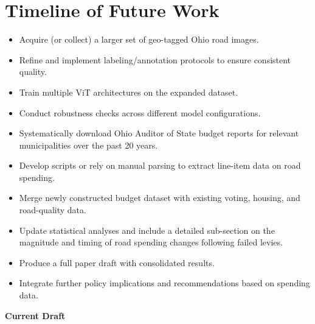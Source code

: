 \newpage

\section*{Timeline of Future Work}

\begin{itemize}
    \item Acquire (or collect) a larger set of geo-tagged Ohio road images.
    \item Refine and implement labeling/annotation protocols to ensure consistent quality.
\end{itemize}

\begin{itemize}
    \item Train multiple ViT architectures on the expanded dataset.
    \item Conduct robustness checks across different model configurations.
\end{itemize}

\begin{itemize}
    \item Systematically download Ohio Auditor of State budget reports for relevant municipalities over the past 20 years.
    \item Develop scripts or rely on manual parsing to extract line-item data on road spending.
\end{itemize}

\begin{itemize}
    \item Merge newly constructed budget dataset with existing voting, housing, and road-quality data.
    \item Update statistical analyses and include a detailed sub-section on the magnitude and timing of road spending changes following failed levies.
\end{itemize}

\begin{itemize}
    \item Produce a full paper draft with consolidated results.
    \item Integrate further policy implications and recommendations based on spending data.
\end{itemize}

\newpage
\begin{center}
    \vspace*{\fill}
    \Huge{{\bf Current Draft}}
    \vspace*{\fill}
\end{center}

\newpage